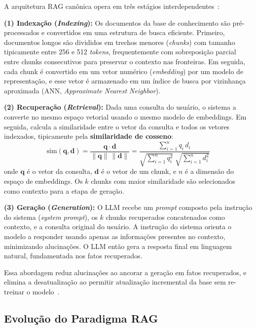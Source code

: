 \documentclass[conference]{IEEEtran}
\begin{document}
A arquitetura RAG canônica opera em três estágios
interdependentes~\cite{gao2024survey}:

\textbf{(1) Indexação (\textit{Indexing}):}
Os documentos da base de conhecimento são pré-processados e
convertidos em uma estrutura de busca eficiente.
Primeiro, documentos longos são divididos em trechos menores
(\textit{chunks}) com tamanho tipicamente entre 256 e 512
\textit{tokens}, frequentemente com sobreposição parcial entre
chunks consecutivos para preservar o contexto nas fronteiras.
Em seguida, cada chunk é convertido em um vetor numérico
(\textit{embedding}) por um modelo de representação, e esse
vetor é armazenado em um índice de busca por vizinhança
aproximada (ANN, \textit{Approximate Nearest Neighbor}).

\textbf{(2) Recuperação (\textit{Retrieval}):}
Dada uma consulta do usuário, o sistema a converte no mesmo
espaço vetorial usando o mesmo modelo de embeddings.
Em seguida, calcula a similaridade entre o vetor da consulta
e todos os vetores indexados, tipicamente pela
\textbf{similaridade de cosseno}:
\begin{equation}
\text{sim}(\mathbf{q}, \mathbf{d}) =
  \frac{\mathbf{q} \cdot \mathbf{d}}{\|\mathbf{q}\|\,\|\mathbf{d}\|}
  = \frac{\displaystyle\sum_{i=1}^{n} q_i\,d_i}%
         {\sqrt{\displaystyle\sum_{i=1}^{n} q_i^2}\;
          \sqrt{\displaystyle\sum_{i=1}^{n} d_i^2}}
\label{eq:cosseno}
\end{equation}
onde $\mathbf{q}$ é o vetor da consulta, $\mathbf{d}$ é o vetor
de um chunk, e $n$ é a dimensão do espaço de embeddings.
Os $k$ chunks com maior similaridade são selecionados como
contexto para a etapa de geração.

\textbf{(3) Geração (\textit{Generation}):}
O LLM recebe um \textit{prompt} composto pela instrução do
sistema (\textit{system prompt}), os $k$ chunks recuperados
concatenados como contexto, e a consulta original do usuário.
A instrução do sistema orienta o modelo a responder usando
apenas as informações presentes no contexto, minimizando
alucinações.
O LLM então gera a resposta final em linguagem natural,
fundamentada nos fatos recuperados.

Essa abordagem reduz alucinações ao ancorar a geração em fatos
recuperados, e elimina a desatualização ao permitir atualização
incremental da base sem re-treinar o modelo~\cite{gao2024survey}.

\subsection{Evolução do Paradigma RAG}
\end{document}
